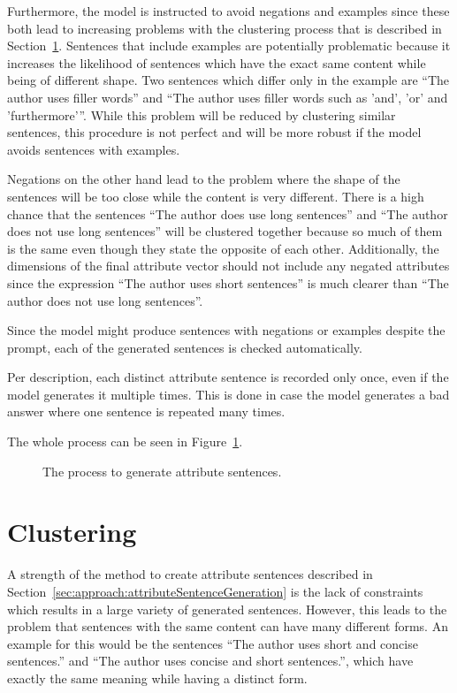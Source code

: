 Furthermore, the model is instructed to avoid negations and examples since these both lead to increasing problems with the clustering process that is described in Section~\ref{sec:approach:clustering}.
Sentences that include examples are potentially problematic because it increases the likelihood of sentences which have the exact same content while being of different shape. %
Two sentences which differ only in the example are \enquote{The author uses filler words} and \enquote{The author uses filler words such as 'and', 'or' and 'furthermore'}. While this problem will be reduced by clustering similar sentences, this procedure is not perfect and will be more robust if the model avoids sentences with examples.

Negations on the other hand lead to the problem where the shape of the sentences will be too close while the content is very different. There is a high chance that the sentences \enquote{The author does use long sentences} and \enquote{The author does not use long sentences} will be clustered together because so much of them is the same even though they state the opposite of each other.
Additionally, the dimensions of the final attribute vector should not include any negated attributes since the expression \enquote{The author uses short sentences} is much clearer than \enquote{The author does not use long sentences}.

Since the model might produce sentences with negations or examples despite the prompt, each of the generated sentences is checked automatically.

Per description, each distinct attribute sentence is recorded only once, even if the model generates it multiple times. This is done in case the model generates a bad answer where one sentence is repeated many times.

The whole process can be seen in Figure~\ref{fig:attributeSentenceGeneration}.

\begin{figure}[ht]
  
  \caption{The process to generate attribute sentences.}
  \label{fig:attributeSentenceGeneration}
\end{figure}


\section{Clustering}
\label{sec:approach:clustering}
A strength of the method to create attribute sentences described in Section~\ref{sec:approach:attributeSentenceGeneration} is the lack of constraints which results in a large variety of generated sentences. However, this leads to the problem that sentences with the same content can have many different forms. An example for this would be the sentences \enquote{The author uses short and concise sentences.} and \enquote{The author uses concise and short sentences.}, which have exactly the same meaning while having a distinct form.

